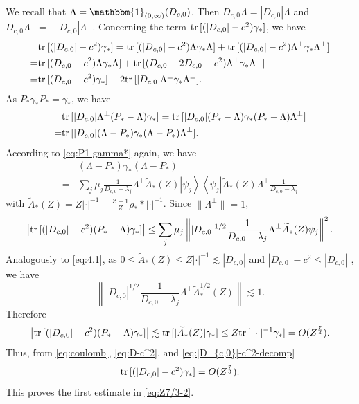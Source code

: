 \documentclass[a4paper]{amsart}
\def\tr{{\rm tr \,}}
\begin{document}
We recall that $\Lambda=\mathbbm{1}_{(0,\infty)}(D_{c,0})$. Then
$D_{c,0} \Lambda=|D_{c,0}|\Lambda$ and
$D_{c,0}\Lambda^\perp=-|D_{c,0}|\Lambda^\perp$. Concerning the term
$\tr[(|D_{c,0}|-c^2)\gamma_*]$, we have
\begin{equation}\label{eq:|D_{c,0}|-c^2-decomp}
  \begin{split}
    &\tr[(|D_{c,0}|-c^2)\gamma_*]=   \tr[(|D_{c,0}|-c^2)\Lambda\gamma_* \Lambda]+\tr[(|D_{c,0}|-c^2)\Lambda^\perp\gamma_* \Lambda^\perp]\\
    = &\tr[(D_{c,0}-c^2)\Lambda\gamma_* \Lambda]+\tr[(D_{c,0}-2D_{c,0}-c^2)\Lambda^\perp\gamma_* \Lambda^\perp]\\
       = &\tr[(D_{c,0}-c^2)\gamma_* ]+2\tr[|D_{c,0}|\Lambda^\perp\gamma_* \Lambda^\perp].
  \end{split}
\end{equation}
As $P_*\gamma_* P_*=\gamma_*$, we have
\begin{equation}
  \begin{split}
    &\tr[|D_{c,0}|\Lambda^\perp (P_*-\Lambda)\gamma_* ]=\tr[|D_{c,0}| (P_*-\Lambda)\gamma_* (P_*-\Lambda)\Lambda^\perp]\\
    =& \tr[|D_{c,0}| (\Lambda- P_*)\gamma_* (\Lambda- P_*)\Lambda^\perp].
  \end{split}
\end{equation}
According to \eqref{eq:P1-gamma*} again, we have
\begin{equation}
  \begin{split}
    &(\Lambda- P_*)\gamma_*(\Lambda- P_*) \\
    =& \sum_{j}\mu_j \frac{1}{D_{c,0} -\lambda_j} \Lambda^\perp \widetilde{A}_*(Z)\left|\psi_j\right>\left<\psi_j\right|\widetilde{A}_*(Z) \Lambda^\perp \frac{1}{D_{c,0}  -\lambda_j}
\end{split}
\end{equation}
with
$\widetilde{A}_*(Z)= Z|\cdot|^{-1}-\tfrac{Z-1}{Z}
\rho_**|\cdot|^{-1}$. Since $\|\Lambda^\perp\|=1$,
\begin{equation}
    \left|\tr[ (|D_{c,0}|-c^2)(P_*-\Lambda)\gamma_*]\right|\leq \sum_{j}\mu_j\left\| |D_{c,0}|^{1/2} \frac{1}{D_{c,0} -\lambda_j} \Lambda^\perp \widetilde{A}_*(Z)\psi_j\right\|^2.
\end{equation}
Analogously to \eqref{eq:4.1}, as
$0\leq \widetilde{A}_*(Z) \leq Z|\cdot|^{-1}\lesssim |D_{c,0}|$ and
$|D_{c,0}|-c^2\leq |D_{c,0}|$ , we have
\begin{equation}
    \left\||D_{c,0}|^{1/2} \frac{1}{D_{c,0} -\lambda_j} \Lambda^\perp \widetilde{A}_*^{1/2}(Z)\right\|\lesssim 1.
\end{equation}
Therefore
\begin{equation}
    \left|\tr[ (|D_{c,0}|-c^2)(P_*-\Lambda)\gamma_*]\right|\lesssim  \tr[|\widetilde{A}_*(Z)|\gamma_*]\leq Z\tr[|\cdot|^{-1}\gamma_*]=O(Z^{\frac73}).
\end{equation}
Thus, from \eqref{eq:coulomb}, \eqref{eq:D-c^2}, and
\eqref{eq:|D_{c,0}|-c^2-decomp}
\begin{equation}
    \tr[(|D_{c,0}|-c^2)\gamma_*]=O(Z^{\frac73}).
\end{equation}
This proves the first estimate in \eqref{eq:Z7/3-2}.
\end{document}
